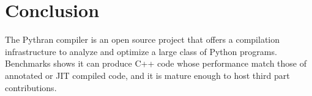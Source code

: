 \documentclass{llncs}
\begin{document}
\section{Conclusion}

The Pythran compiler is an open source project that offers a compilation
infrastructure to analyze and optimize a large class of Python programs.
Benchmarks shows it can produce C++ code whose performance match those of
annotated or JIT compiled code, and it is mature enough to host third part
contributions.
\end{document}
